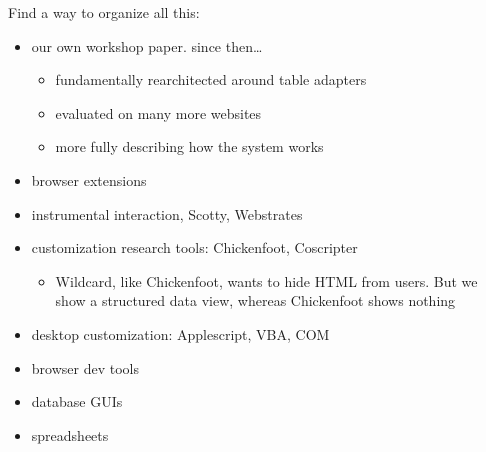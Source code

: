 \documentclass[sigplan,10pt,anonymous,review]{acmart}
\providecommand{\tightlist}{%
  \setlength{\itemsep}{0pt}\setlength{\parskip}{0pt}}
\begin{document}
Find a way to organize all this:

\begin{itemize}
\tightlist
\item
  our own workshop paper. since then\ldots{}

  \begin{itemize}
  \tightlist
  \item
    fundamentally rearchitected around table adapters
  \item
    evaluated on many more websites
  \item
    more fully describing how the system works
  \end{itemize}
\item
  browser extensions
\item
  instrumental interaction, Scotty, Webstrates
\item
  customization research tools: Chickenfoot, Coscripter

  \begin{itemize}
  \tightlist
  \item
    Wildcard, like Chickenfoot, wants to hide HTML from users. But we
    show a structured data view, whereas Chickenfoot shows nothing
  \end{itemize}
\item
  desktop customization: Applescript, VBA, COM
\item
  browser dev tools
\item
  database GUIs
\item
  spreadsheets
\end{itemize}

\end{document}
